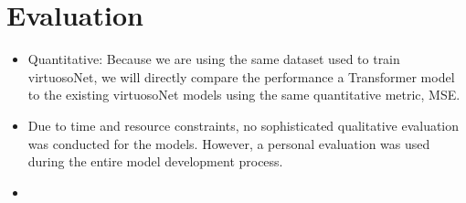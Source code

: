 \section{Evaluation}
\begin{itemize}
    \item Quantitative: Because we are using the same dataset used to train virtuosoNet, we will directly compare the performance a Transformer model to the existing virtuosoNet models using the same quantitative metric, MSE. 
    \item Due to time and resource constraints, no sophisticated qualitative evaluation was conducted for the models. However, a personal evaluation was used during the entire model development process. 
    \item 
\end{itemize}
